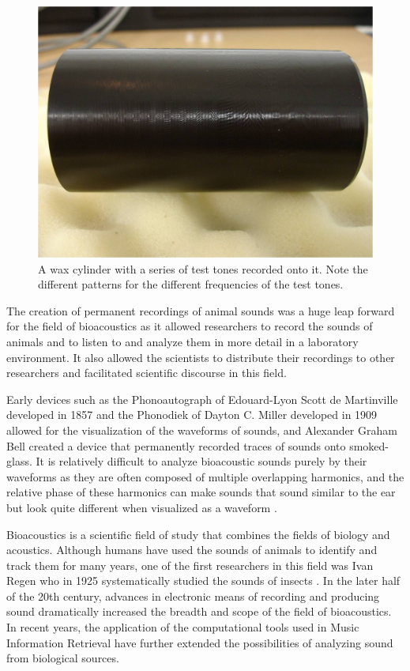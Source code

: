 \begin{figure}[t]
\centering
\includegraphics[width=\columnwidth]{figures/waxCylinder}
\caption{A wax cylinder with a series of test tones recorded onto it.
  Note the different patterns for the different frequencies of the
  test tones.}
\label{fig:waxCylinder}
\end{figure}


The creation of permanent recordings of animal sounds was a huge leap
forward for the field of bioacoustics as it allowed researchers to
record the sounds of animals and to listen to and analyze them in more
detail in a laboratory environment.  It also allowed the scientists to
distribute their recordings to other researchers and facilitated
scientific discourse in this field.

Early devices such as the Phonoautograph of Edouard-Lyon Scott de
Martinville developed in 1857 and the Phonodiek of Dayton C. Miller
developed in 1909 allowed for the visualization of the waveforms of
sounds, and Alexander Graham Bell created a device that permanently
recorded traces of sounds onto smoked-glass.  It is relatively
difficult to analyze bioacoustic sounds purely by their waveforms as
they are often composed of multiple overlapping harmonics, and the
relative phase of these harmonics can make sounds that sound similar
to the ear but look quite different when visualized as a waveform
\cite{au2000hearing}.

Bioacoustics is a scientific field of study that combines the fields
of biology and acoustics.  Although humans have used the sounds of
animals to identify and track them for many years, one of the first
researchers in this field was Ivan Regen who in 1925 systematically
studied the sounds of insects \cite{zarnik1929zivot}.  In the later
half of the 20th century, advances in electronic means of recording
and producing sound dramatically increased the breadth and scope of
the field of bioacoustics.  In recent years, the application of the
computational tools used in Music Information Retrieval have further
extended the possibilities of analyzing sound from biological sources.


